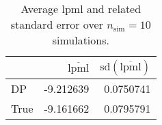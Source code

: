 \begin{table}[H]

\caption{Average lpml and related standard error over $n_{\text{sim}} = 10$ simulations.}
\centering
\begin{tabular}[t]{lrr}
\toprule
  & $\overbar{\text{lpml}}$ & $\text{sd}(\overbar{\text{lpml}})$\\
\midrule
DP & -9.212639 & 0.0750741\\
True & -9.161662 & 0.0795791\\
\bottomrule
\end{tabular}
\end{table}